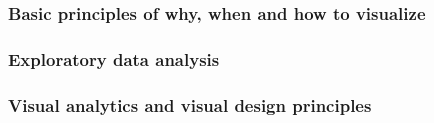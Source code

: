 \subsubsection{Basic principles of why, when and how to visualize}
\label{s:basics}


\subsubsection{Exploratory data analysis}
\label{s:eda}


\subsubsection{Visual analytics and visual design principles}
\label{s:va}












